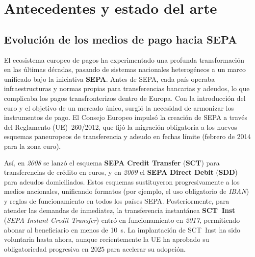 
\section{Antecedentes y estado del arte}
\label{sec:estado-arte}

\subsection{Evolución de los medios de pago hacia SEPA}
\label{subsec:evolucion-sepa}


El ecosistema europeo de pagos ha experimentado una profunda transformación en las últimas décadas, pasando de sistemas nacionales heterogéneos a un marco unificado bajo la iniciativa \textbf{SEPA}. Antes de SEPA, cada país operaba infraestructuras y normas propias para transferencias bancarias y adeudos, lo que complicaba los pagos transfronterizos dentro de Europa.  
Con la introducción del euro y el objetivo de un mercado único, surgió la necesidad de armonizar los instrumentos de pago. El Consejo Europeo impulsó la creación de SEPA a través del Reglamento (UE)~\num{260}/\num{2012}, que fijó la migración obligatoria a los nuevos esquemas paneuropeos de transferencia y adeudo en fechas límite (febrero de 2014 para la zona euro).  

Así, en \textit{2008} se lanzó el esquema \textbf{SEPA Credit Transfer} (\textbf{SCT}) para transferencias de crédito en euros, y en \textit{2009} el \textbf{SEPA Direct Debit} (\textbf{SDD}) para adeudos domiciliados. Estos esquemas sustituyeron progresivamente a los medios nacionales, unificando formatos (por ejemplo, el uso obligatorio de \emph{IBAN}) y reglas de funcionamiento en todos los países SEPA. Posteriormente, para atender las demandas de inmediatez, la transferencia instantánea \textbf{SCT~Inst} (\emph{SEPA Instant Credit Transfer}) entró en funcionamiento en \textit{2017}, permitiendo abonar al beneficiario en menos de \SI{10}{\second}. La implantación de SCT~Inst ha sido voluntaria hasta ahora, aunque recientemente la UE ha aprobado su obligatoriedad progresiva en 2025 para acelerar su adopción.  

